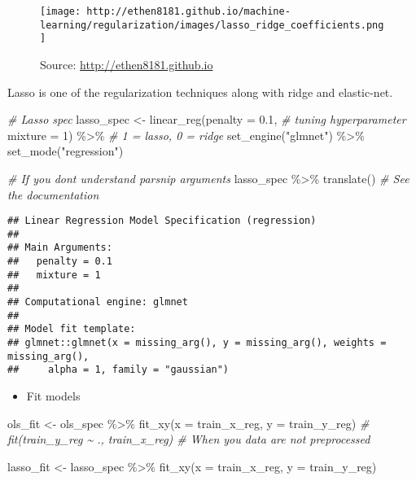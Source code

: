 \documentclass[
]{book}
\newenvironment{Shaded}{\begin{snugshade}}{\end{snugshade}}
\newcommand{\AttributeTok}[1]{\textcolor[rgb]{0.77,0.63,0.00}{#1}}
\newcommand{\CommentTok}[1]{\textcolor[rgb]{0.56,0.35,0.01}{\textit{#1}}}
\newcommand{\DecValTok}[1]{\textcolor[rgb]{0.00,0.00,0.81}{#1}}
\newcommand{\FloatTok}[1]{\textcolor[rgb]{0.00,0.00,0.81}{#1}}
\newcommand{\FunctionTok}[1]{\textcolor[rgb]{0.00,0.00,0.00}{#1}}
\newcommand{\NormalTok}[1]{#1}
\newcommand{\OtherTok}[1]{\textcolor[rgb]{0.56,0.35,0.01}{#1}}
\newcommand{\SpecialCharTok}[1]{\textcolor[rgb]{0.00,0.00,0.00}{#1}}
\newcommand{\StringTok}[1]{\textcolor[rgb]{0.31,0.60,0.02}{#1}}
\providecommand{\tightlist}{%
  \setlength{\itemsep}{0pt}\setlength{\parskip}{0pt}}
\begin{document}
\begin{figure}
\centering
\texttt{[image: http://ethen8181.github.io/machine-learning/regularization/images/lasso\_ridge\_coefficients.png]}
\caption{Source: \url{http://ethen8181.github.io}}
\end{figure}

Lasso is one of the regularization techniques along with ridge and elastic-net.

\begin{Shaded}
\begin{Highlighting}[]
\CommentTok{\# Lasso spec }
\NormalTok{lasso\_spec }\OtherTok{\textless{}{-}} \FunctionTok{linear\_reg}\NormalTok{(}\AttributeTok{penalty =} \FloatTok{0.1}\NormalTok{, }\CommentTok{\# tuning hyperparameter }
                         \AttributeTok{mixture =} \DecValTok{1}\NormalTok{) }\SpecialCharTok{\%\textgreater{}\%} \CommentTok{\# 1 = lasso, 0 = ridge }
  \FunctionTok{set\_engine}\NormalTok{(}\StringTok{"glmnet"}\NormalTok{) }\SpecialCharTok{\%\textgreater{}\%}
  \FunctionTok{set\_mode}\NormalTok{(}\StringTok{"regression"}\NormalTok{) }

\CommentTok{\# If you don\textquotesingle{}t understand parsnip arguments }
\NormalTok{lasso\_spec }\SpecialCharTok{\%\textgreater{}\%} \FunctionTok{translate}\NormalTok{() }\CommentTok{\# See the documentation}
\end{Highlighting}
\end{Shaded}

\begin{verbatim}
## Linear Regression Model Specification (regression)
## 
## Main Arguments:
##   penalty = 0.1
##   mixture = 1
## 
## Computational engine: glmnet 
## 
## Model fit template:
## glmnet::glmnet(x = missing_arg(), y = missing_arg(), weights = missing_arg(), 
##     alpha = 1, family = "gaussian")
\end{verbatim}

\begin{itemize}
\tightlist
\item
  Fit models
\end{itemize}

\begin{Shaded}
\begin{Highlighting}[]
\NormalTok{ols\_fit }\OtherTok{\textless{}{-}}\NormalTok{ ols\_spec }\SpecialCharTok{\%\textgreater{}\%}
  \FunctionTok{fit\_xy}\NormalTok{(}\AttributeTok{x =}\NormalTok{ train\_x\_reg, }\AttributeTok{y =}\NormalTok{ train\_y\_reg) }
  \CommentTok{\# fit(train\_y\_reg \textasciitilde{} ., train\_x\_reg) \# When you data are not preprocessed }

\NormalTok{lasso\_fit }\OtherTok{\textless{}{-}}\NormalTok{ lasso\_spec }\SpecialCharTok{\%\textgreater{}\%}
  \FunctionTok{fit\_xy}\NormalTok{(}\AttributeTok{x =}\NormalTok{ train\_x\_reg, }\AttributeTok{y =}\NormalTok{ train\_y\_reg) }
\end{Highlighting}
\end{Shaded}
\end{document}
